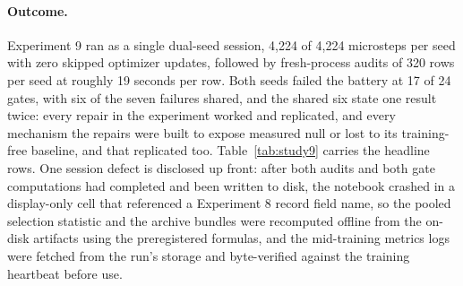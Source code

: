 \documentclass[10pt,a4paper]{article}
\begin{document}
\paragraph{Outcome.}
Experiment 9 ran as a single dual-seed session, 4{,}224 of 4{,}224 microsteps per
seed with zero skipped optimizer updates, followed by fresh-process audits of
320 rows per seed at roughly 19 seconds per row. Both seeds failed the
battery at 17 of 24 gates, with six of the seven failures shared, and the
shared six state one result twice: every repair in the experiment worked and
replicated, and every mechanism the repairs were built to expose measured
null or lost to its training-free baseline, and that replicated too.
Table~\ref{tab:study9} carries the headline rows. One session defect is
disclosed up front: after both audits and both gate computations had completed
and been written to disk, the notebook crashed in a display-only cell that
referenced a Experiment 8 record field name, so the pooled selection statistic and
the archive bundles were recomputed offline from the on-disk artifacts using
the preregistered formulas, and the mid-training metrics logs were fetched
from the run's storage and byte-verified against the training heartbeat
before use.
\end{document}
